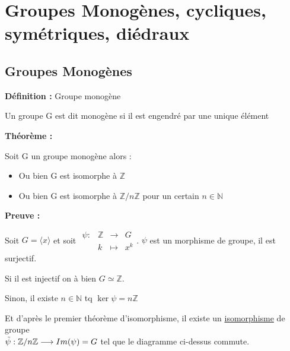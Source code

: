 \documentclass{report}
\newenvironment{definition}[1][]{
    \begin{tcolorbox}[colframe= white]
    \textbf{Définition :} 
    #1 \par
    }
    {\end{tcolorbox}}
\newenvironment{preuve}{\begin{tcolorbox}[colframe= white]
    \textbf{Preuve :}
\par }
    {\end{tcolorbox}}
\newenvironment{theoreme}[1][]{
    \begin{tcolorbox}[]
    \textbf{Théorème :} #1  \par} 
    {\end{tcolorbox}}
\newcommand{\fonction}[5]{
    \begin{array}{l|rcl}
    #1: & #2 & \longrightarrow & #3 \\
        & #4 & \longmapsto & #5 
    \end{array}
}
\newcommand{\N}{\mathbb{N}}
\newcommand{\Z}{\mathbb{Z}}
\newcommand{\dsp}{\displaystyle}
\begin{document}
\section{Groupes Monogènes, cycliques, symétriques, diédraux}

\subsection{Groupes Monogènes}

\begin{definition}[Groupe monogène]
Un groupe G est dit monogène si il est engendré par une unique élément
\end{definition}

\begin{theoreme}
Soit G un groupe monogène alors : \par
\begin{itemize}
\item Ou bien G est isomorphe à $\Z$
\item Ou bien G est isomorphe à $\Z / n\Z$ pour un certain $n \in \N$
\end{itemize}
\end{theoreme}

\begin{preuve}

\noindent Soit $G = \langle x \rangle$ et soit $\fonction{\psi}{\Z}{G}{k}{x^{k}}$. $\psi$ est un morphisme de groupe, il est surjectif. \par
\quad Si il est injectif on à bien $G\simeq \Z$. \par
Sinon, il existe $n\in \N$ tq $\ker \psi = n\Z$  \par

\begin{center}
\end{center}
Et d'après le premier théorème d'isomorphisme, il existe un \underline{isomorphisme} de groupe\\$\dsp\Tilde{\psi} : \Z/n\Z \longrightarrow Im(\psi)=G$ tel que le diagramme ci-dessus  commute.



\end{preuve}
\end{document}
